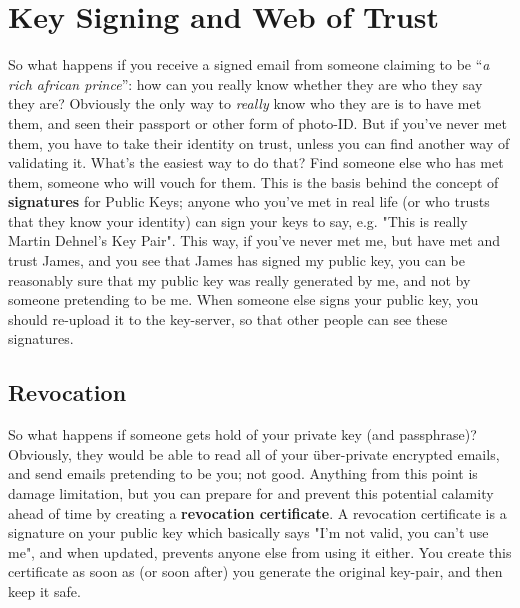 \section{Key Signing and Web of Trust}
So what happens if you receive a signed email from someone claiming to be ``\textit{a rich african prince}'': how can you really know whether they are who they say they are? Obviously the only way to \textit{really} know who they are is to have met them, and seen their passport or other form of photo-ID. But if you've never met them, you have to take their identity on trust, unless you can find another way of validating it. What's the easiest way to do that? Find someone else who has met them, someone who will vouch for them. This is the basis behind the concept of \textbf{signatures} for Public Keys; anyone who you've met in real life (or who trusts that they know your identity) can sign your keys to say, e.g. "This is really Martin Dehnel's Key Pair". This way, if you've never met me, but have met and trust James, and you see that James has signed my public key, you can be reasonably sure that my public key was really generated by me, and not by someone pretending to be me. When someone else signs your public key, you should re-upload it to the key-server, so that other people can see these signatures.
\subsection{Revocation}
So what happens if someone gets hold of your private key (and passphrase)? Obviously, they would be able to read all of your \"{u}ber-private encrypted emails, and send emails pretending to be you; not good. Anything from this point is damage limitation, but you can prepare for and prevent this potential calamity ahead of time by creating a \textbf{revocation certificate}. A revocation certificate is a signature on your public key which basically says "I'm not valid, you can't use me", and when updated, prevents anyone else from using it either. You create this certificate as soon as (or soon after) you generate the original key-pair, and then keep it safe. 















\loggingall

\endinput
